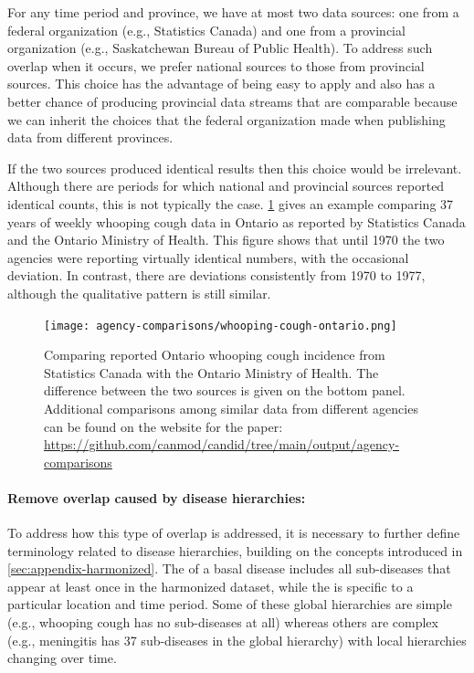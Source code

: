 \documentclass[12pt]{article}
\begin{document}
For any time period and province, we have at most two data sources: one from a federal organization (e.g., Statistics Canada) and one from a provincial organization (e.g., Saskatchewan Bureau of Public Health). To address such overlap when it occurs, we prefer national sources to those from provincial sources. This choice has the advantage of being easy to apply and also has a better chance of producing provincial data streams that are comparable because we can inherit the choices that the federal organization made when publishing data from different provinces.

If the two sources produced identical results then this choice would be irrelevant. Although there are periods for which national and provincial sources reported identical counts, this is not typically the case. \cref{fig:appendix-statcanmoh} gives an example comparing 37 years of weekly whooping cough data in Ontario as reported by Statistics Canada and the Ontario Ministry of Health. This figure shows that until 1970 the two agencies were reporting virtually identical numbers, with the occasional deviation. In contrast, there are deviations consistently from 1970 to 1977, although the qualitative pattern is still similar.

\begin{figure}
  \texttt{[image: agency-comparisons/whooping-cough-ontario.png]}
\caption{Comparing reported Ontario whooping cough incidence from Statistics Canada with the Ontario Ministry of Health. The difference between the two sources is given on the bottom panel. Additional comparisons among similar data from different agencies can be found on the website for the paper: \url{https://github.com/canmod/candid/tree/main/output/agency-comparisons}}\label{fig:appendix-statcanmoh}
\end{figure}

\paragraph{Remove overlap caused by disease hierarchies:} To address how this type of overlap is addressed, it is necessary to further define terminology related to disease hierarchies, building on the concepts introduced in \cref{sec:appendix-harmonized}. The  of a basal disease includes all sub-diseases that appear at least once in the harmonized dataset, while the  is specific to a particular location and time period. Some of these global hierarchies are simple (e.g., whooping cough has no sub-diseases at all) whereas others are complex (e.g., meningitis has 37 sub-diseases in the global hierarchy) with local hierarchies changing over time. 
\end{document}
